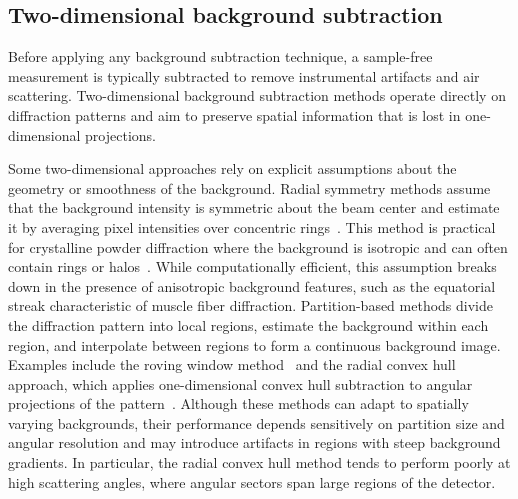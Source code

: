 \documentclass[iucr]{iucrjournals}
\begin{document}
\subsection{Two-dimensional background subtraction}

Before applying any background subtraction technique, a sample-free measurement is typically subtracted to remove instrumental artifacts and air scattering. Two-dimensional background subtraction methods operate directly on diffraction patterns and aim to preserve spatial information that is lost in one-dimensional projections.

Some two-dimensional approaches rely on explicit assumptions about the geometry or smoothness of the background. Radial symmetry methods assume that the background intensity is symmetric about the beam center and estimate it by averaging pixel intensities over concentric rings~\cite{rajkumar2007fibrefix}. This method is practical for crystalline powder diffraction where the background is isotropic and can often contain rings or halos~\cite{ashiotis2015pyfai}. While computationally efficient, this assumption breaks down in the presence of anisotropic background features, such as the equatorial streak characteristic of muscle fiber diffraction. Partition-based methods divide the diffraction pattern into local regions, estimate the background within each region, and interpolate between regions to form a continuous background image. Examples include the roving window method~\cite{HeEtAl2007} and the radial convex hull approach, which applies one-dimensional convex hull subtraction to angular projections of the pattern~\cite{lee2019musclex}. Although these methods can adapt to spatially varying backgrounds, their performance depends sensitively on partition size and angular resolution and may introduce artifacts in regions with steep background gradients. In particular, the radial convex hull method tends to perform poorly at high scattering angles, where angular sectors span large regions of the detector.
\end{document}
